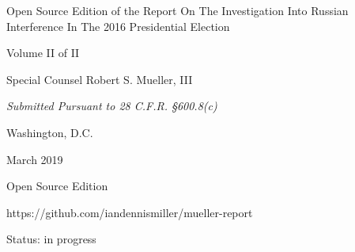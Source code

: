 \thispagestyle{empty}

\begin{center}
\Huge
Open Source Edition of the
Report On The Investigation Into Russian Interference In The 2016 Presidential Election

\vspace{10 mm}

\large
Volume II of II

\vspace{10 mm}

Special Counsel Robert S. Mueller, III

\vspace{10 mm}

\normalsize

\textit{Submitted Pursuant to 28 C.F.R. \S 600.8(c)}

\vspace{20 mm}

Washington, D.C.

\vspace{10 mm}

March 2019

\vspace{10 mm}

\large
Open Source Edition

https://github.com/iandennismiller/mueller-report

Status: in progress

\end{center}

\newpage
